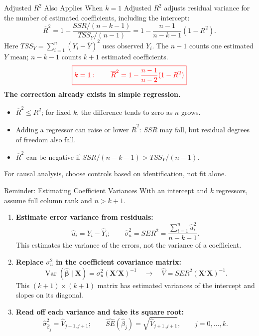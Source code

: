 \documentclass[notes,10pt, aspectratio=169]{beamer}
\begin{document}
\begin{frame}{Adjusted $R^2$ Also Applies When $k=1$}
\small
Adjusted $R^2$ adjusts residual variance for the number of estimated coefficients, including the intercept:
\[
    \overline{R}^2
    =1-\frac{SSR/(n-k-1)}{TSS_Y/(n-1)}
    =1-\frac{n-1}{n-k-1}(1-R^2).
\]
Here $TSS_Y=\sum_{i=1}^n(Y_i-\bar{Y})^2$ uses observed $Y_i$.
The $n-1$ counts one estimated $Y$ mean; $n-k-1$ counts $k+1$ estimated coefficients.
\[
    \textcolor{red}{\boxed{k=1:\qquad
    \overline{R}^2=1-\frac{n-1}{n-2}(1-R^2)}}
\]
\textbf{The correction already exists in simple regression.}
\begin{itemize}
    \item $\overline{R}^2\leq R^2$; for fixed $k$, the difference tends to zero as $n$ grows.
    \item Adding a regressor can raise or lower $\overline{R}^2$: $SSR$ may fall, but residual degrees of freedom also fall.
    \item $\overline{R}^2$ can be negative if $SSR/(n-k-1)>TSS_Y/(n-1)$.
\end{itemize}
\medskip
For causal analysis, choose controls based on identification, not fit alone.
\end{frame}

\begin{frame}{Reminder: Estimating Coefficient Variances}
\footnotesize
\setlength{\abovedisplayskip}{3pt}
\setlength{\belowdisplayskip}{3pt}
With an intercept and $k$ regressors, assume full column rank and $n>k+1$.
\begin{enumerate}
\setlength{\itemsep}{4pt}
    \item \textbf{Estimate error variance from residuals:}
    \[
        \hat{u}_i=Y_i-\hat{Y}_i;\qquad
        \hat{\sigma}_u^2=SER^2=\frac{\sum_{i=1}^n\hat{u}_i^2}{n-k-1}.
    \]
    This estimates the variance of the errors, not the variance of a coefficient.
    \item \textbf{Replace $\sigma_u^2$ in the coefficient covariance matrix:}
    \[
        \operatorname{Var}(\hat{\boldsymbol{\beta}}\mid\mathbf{X})
        =\sigma_u^2(\mathbf{X}'\mathbf{X})^{-1}
        \quad\longrightarrow\quad
        \hat{V}=SER^2(\mathbf{X}'\mathbf{X})^{-1}.
    \]
    This $(k+1)\times(k+1)$ matrix has estimated variances of the intercept and slopes on its diagonal.
    \item \textbf{Read off each variance and take its square root:}
    \[
        \hat{\sigma}^{2}_{\hat{\beta}_j}=\hat{V}_{j+1,j+1};\qquad
        \widehat{SE}(\hat{\beta}_j)=\sqrt{\hat{V}_{j+1,j+1}},\qquad j=0,\ldots,k.
    \]
\end{enumerate}
\end{frame}
\end{document}
